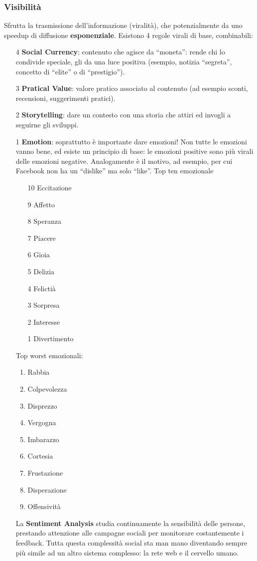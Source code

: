 \subsubsection{Visibilit\`a}
Sfrutta la trasmissione dell'informazione (viralit\`a), che potenzialmente da uno speedup di diffusione \textbf{esponenziale}.
Esistono 4 regole virali di base, combinabili:
\begin{enumerate}

\item[4] \textbf{Social Currency}: contenuto che agisce da ``moneta'': rende chi lo condivide speciale, gli da una luce positiva (esempio, notizia ``segreta'', concetto di ``elite'' o di ``prestigio'').
\item[3] \textbf{Pratical Value}: valore pratico associato al contenuto (ad esempio sconti, recensioni, suggerimenti pratici).
\item[2] \textbf{Storytelling}: dare un contesto con una storia che attiri ed invogli a seguirne gli sviluppi.
\item[1] \textbf{Emotion}: soprattutto \`e importante dare emozioni! Non tutte le emozioni vanno bene, ed esiste un principio di base: le emozioni positive sono pi\`u virali delle emozioni negative. Analogamente \`e il motivo, ad esempio, per cui Facebook non ha un ``dislike'' ma solo ``like''. Top ten emozionale
  \begin{enumerate}

  \item[10] Eccitazione
  \item[9] Affetto
  \item[8] Speranza
  \item[7] Piacere
  \item[6] Gioia
  \item[5] Delizia
  \item[4] Felicti\`a
  \item[3] Sorpresa
  \item[2] Interesse
  \item[1] Divertimento
  \end{enumerate}

  Top worst emozionali:
  \begin{enumerate}
    
  \item Rabbia
  \item Colpevolezza
  \item Disprezzo
  \item Vergogna
  \item Imbarazzo
  \item Cortesia
  \item Frustazione
  \item Disperazione
  \item Offensivit\`a
    
  \end{enumerate}

  La \textbf{Sentiment Analysis} studia continuamente la sensibilit\`a delle persone, prestando attenzione alle campagne sociali per monitorare costantemente i feedback. Tutta questa complessit\`a social sta man mano diventando sempre pi\`u simile ad un altro sistema complesso: la rete web e il cervello umano.
  
\end{enumerate}
